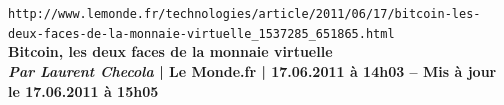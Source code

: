 \documentclass[11pt,twoside,a4paper]{article}
\begin{document}
\setlength\parindent{0pt}






\texttt{http://www.lemonde.fr/technologies/article/2011/06/17/bitcoin-les-deux-faces-de-la-monnaie-virtuelle\_1537285\_651865.html}~\\

\textbf{Bitcoin, les deux faces de la monnaie virtuelle}~\\

\textbf{\small \emph{Par Laurent Checola} | Le Monde.fr | 17.06.2011 {\`a} 14h03 -- Mis {\`a} jour le 17.06.2011 {\`a} 15h05  }~\\
\end{document}
